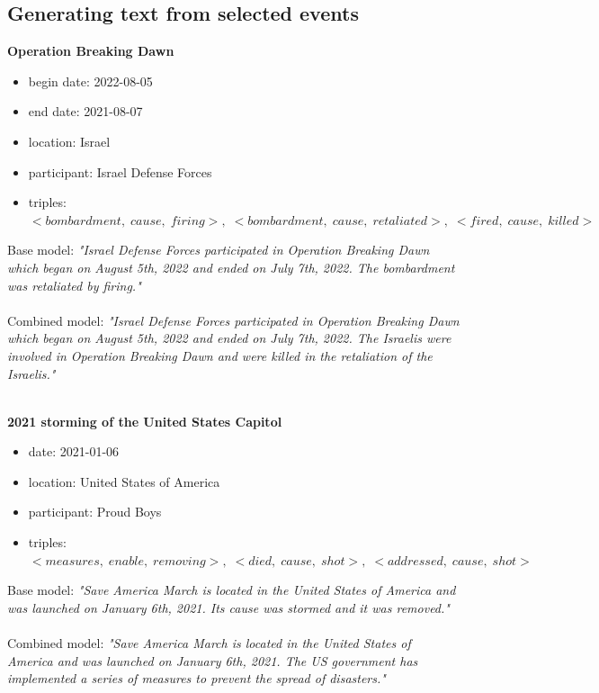\documentclass[
hf, %
]{ceurart}
\begin{document}
\subsection{Generating text from selected events}
\label{appx:selected_processed_events}

\textbf{Operation Breaking Dawn}
\begin{itemize}
    \item begin date: 2022-08-05
    \item end date: 2021-08-07
    \item location: Israel
    \item participant: Israel Defense Forces
    \item triples: $<bombardment,\;cause,\;firing>,\; <bombardment,\; cause,\; retaliated>,\; <fired,\; cause,\; killed>$
\end{itemize}
Base model: \textit{"Israel Defense Forces participated in Operation Breaking Dawn which began on August 5th, 2022 and ended on July 7th, 2022. The bombardment was retaliated by firing."}\\\\
\noindent
Combined model: \textit{"Israel Defense Forces participated in Operation Breaking Dawn which began on August 5th, 2022 and ended on July 7th, 2022. The Israelis were involved in Operation Breaking Dawn and were killed in the retaliation of the Israelis."}\\\\
\noindent

\textbf{2021 storming of the United States Capitol}
\begin{itemize}
    \item date: 2021-01-06
    \item location: United States of America
    \item participant: Proud Boys
    \item triples: $<measures,\;enable,\;removing>,\; <died,\; cause,\; shot>,\; <addressed,\; cause,\; shot>$
\end{itemize}
Base model: \textit{"Save America March is located in the United States of America and was launched on January 6th, 2021. Its cause was stormed and it was removed."}\\\\
\noindent
Combined model: \textit{"Save America March is located in the United States of America and was launched on January 6th, 2021. The US government has implemented a series of measures to prevent the spread of disasters."}\\\\
\noindent
\end{document}
